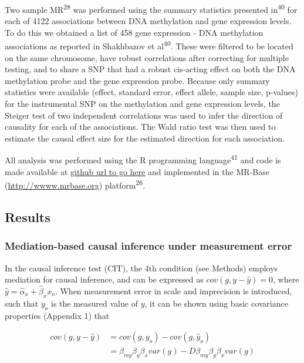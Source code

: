 \documentclass[]{article}
\begin{document}
Two sample MR\textsuperscript{28} was performed using the summary
statistics presented in\textsuperscript{40} for each of 4122
associations between DNA methylation and gene expression levels. To do
this we obtained a list of 458 gene expression - DNA methylation
associations as reported in Shakhbazov et al\textsuperscript{40}. These
were filtered to be located on the same chromosome, have robust
correlations after correcting for multiple testing, and to share a SNP
that had a robust cis-acting effect on both the DNA methylation probe
and the gene expression probe. Because only summary statistics were
available (effect, standard error, effect allele, sample size, p-values)
for the instrumental SNP on the methylation and gene expression levels,
the Steiger test of two independent correlations was used to infer the
direction of causality for each of the associations. The Wald ratio test
was then used to estimate the causal effect size for the estimated
direction for each association.

All analysis was performed using the R programming
language\textsuperscript{41} and code is made available at
\href{}{github url to go here} and implemented in the MR-Base
(\url{http://wwww.mrbase.org}) platform\textsuperscript{26}.

\subsection{Results}\label{results}

\subsubsection{Mediation-based causal inference under measurement
error}\label{mediation-based-causal-inference-under-measurement-error}

In the causal inference test (CIT), the 4th condition (see Methods)
employs mediation for causal inference, and can be expressed as
\(cov(g, y - \hat{y}) = 0\), where
\(\hat{y} = \hat{\alpha}_x + \hat{\beta}_x x_o\). When measurement error
in scale and imprecision is introduced, such that \(y_o\) is the
measured value of \(y\), it can be shown using basic covariance
properties (Appendix 1) that

\[
\begin{aligned}
cov(g, y - \hat{y}) & = cov(g, y_o) - cov(g, \hat{y}_o)  \\
                    & = \beta_{my} \beta_g \beta_x var(g) - D \beta_{my} \beta_g \beta_x var(g)
\end{aligned}
\]
\end{document}
